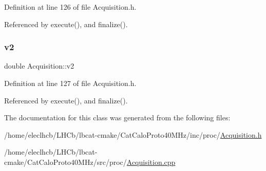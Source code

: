Definition at line 126 of file Acquisition.\+h.



Referenced by execute(), and finalize().

\mbox{\label{classAcquisition_a8d2cd605d4982223356a14423d735c84}} 
\subsubsection{\texorpdfstring{v2}{v2}}
{\footnotesize\ttfamily double Acquisition\+::v2\hspace{0.3cm}{\ttfamily [private]}}



Definition at line 127 of file Acquisition.\+h.



Referenced by execute(), and finalize().



The documentation for this class was generated from the following files\+:\begin{DoxyCompactItemize}
\item 
/home/eleclhcb/\+L\+H\+Cb/lbcat-\/cmake/\+Cat\+Calo\+Proto40\+M\+Hz/inc/proc/\hyperlink{CatCaloProto40MHz_2inc_2proc_2Acquisition_8h}{Acquisition.\+h}\item 
/home/eleclhcb/\+L\+H\+Cb/lbcat-\/cmake/\+Cat\+Calo\+Proto40\+M\+Hz/src/proc/\hyperlink{CatCaloProto40MHz_2src_2proc_2Acquisition_8cpp}{Acquisition.\+cpp}\end{DoxyCompactItemize}
